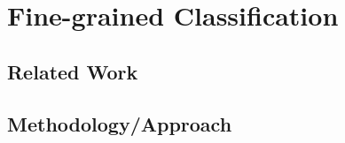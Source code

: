 
\chapter{Fine-grained Classification}

\section{Related Work}




\section{Methodology/Approach}



\noindent 

\begingroup
\renewcommand\thesection{\Alph{section}} %
%
%
%
%

\endgroup
